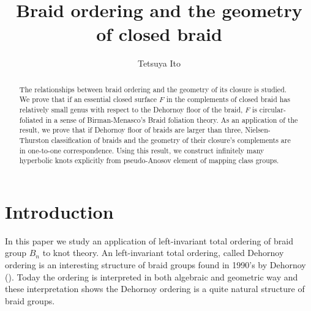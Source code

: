 \documentclass[12pt]{amsart}
\begin{document}
  

\title{Braid ordering and the geometry of closed braid}
\author{Tetsuya Ito}
\address{Graduate School of Mathematical Science, University of Tokyo, 3-8-1 Komaba, Meguro-ku, Tokyo, 153-8914, Japan}
 
\begin{abstract}
   The relationships between braid ordering and the geometry of its closure is studied. We prove that if an essential closed surface $F$ in the complements of closed braid has relatively small genus with respect to the Dehornoy floor of the braid, $F$ is circular-foliated in a sense of Birman-Menasco's Braid foliation theory. As an application of the result, we prove that if Dehornoy floor of braids are larger than three, Nielsen-Thurston classification of braids and the geometry of their closure's complements are in one-to-one correspondence. Using this result, we construct infinitely many hyperbolic knots explicitly from pseudo-Anosov element of mapping class groups.


\end{abstract}
\maketitle
 

\section{Introduction}
   In this paper we study an application of left-invariant total ordering of braid group $B_{n}$ to knot theory. An left-invariant total ordering, called Dehornoy ordering is an interesting structure of braid groups found in 1990's by Dehornoy (\cite{d}). Today the ordering is interpreted in both algebraic and geometric way and these interpretation shows the Dehornoy ordering is a quite natural structure of braid groups.
\end{document}
